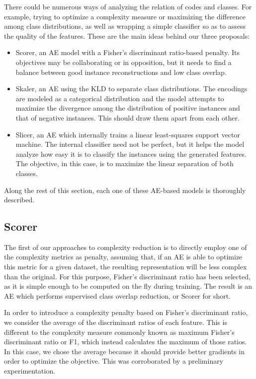 There could be numerous ways of analyzing the relation of codes and classes. For example, trying to optimize a complexity measure or maximizing the difference among class distributions, as well as wrapping a simple classifier so as to assess the quality of the features. These are the main ideas behind our three proposals:
\begin{itemize}
  \item Scorer, an AE model with a Fisher's discriminant ratio-based penalty. Its objectives may be collaborating or in opposition, but it needs to find a balance between good instance reconstructions and low class overlap.
  \item Skaler, an AE using the KLD to separate class distributions. The encodings are modeled as a categorical distribution and the model attempts to maximize the divergence among the distribution of positive instances and that of negative instances. This should draw them apart from each other.
  \item Slicer, an AE which internally trains a linear least-squares support vector machine. The internal classifier need not be perfect, but it helps the model analyze how easy it is to classify the instances using the generated features. The objective, in this case, is to maximize the linear separation of both classes.
\end{itemize}
Along the rest of this section, each one of these AE-based models is thoroughly described.



\subsection{Scorer}


The first of our approaches to complexity reduction is to directly employ one of the complexity metrics as penalty, assuming that, if an AE is able to optimize this metric for a given dataset, the resulting representation will be less complex than the original. For this purpose, Fisher's discriminant ratio has been selected, as it is simple enough to be computed on the fly during training. The result is an AE which performs supervised class overlap reduction, or Scorer for short.

In order to introduce a complexity penalty based on Fisher's discriminant ratio, we consider the average of the discriminant ratios of each feature. This is different to the complexity measure commonly known as maximum Fisher's discriminant ratio or F1, which instead calculates the maximum of those ratios. In this case, we chose the average because it should provide better gradients in order to optimize the objective. This was corroborated by a preliminary experimentation.

